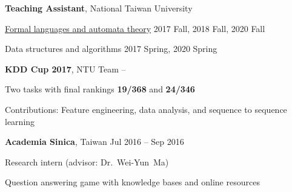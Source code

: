 \documentclass[letterpaper,MMMyyyy,nonstopmode]{simpleresumecv}
\begin{document}
\begin{Body}
\Entry
\textbf{Teaching Assistant},
National Taiwan University

\Gap
\BulletItem
\href{}{Formal languages and automata theory}
\hfill
2017 Fall, 2018 Fall, 2020 Fall

\Gap
\BulletItem
{Data structures and algorithms}
\hfill
2017 Spring, 2020 Spring

\BigGap

\Entry
\textbf{KDD Cup 2017}, NTU Team
\hfill
{} -- 

\Gap
\BulletItem
Two tasks with final rankings \textbf{19/368} and \textbf{24/346}

\Gap
\BulletItem
Contributions: Feature engineering, data analysis, and sequence to sequence learning



\BigGap

\Entry
\textbf{Academia Sinica}, Taiwan 
\hfill
Jul 2016 -- Sep 2016

\Gap
\BulletItem
Research intern (advisor: Dr.~Wei-Yun~Ma)

\SubBulletItem
Question answering game with knowledge bases and online resources








\end{Body}
\end{document}
